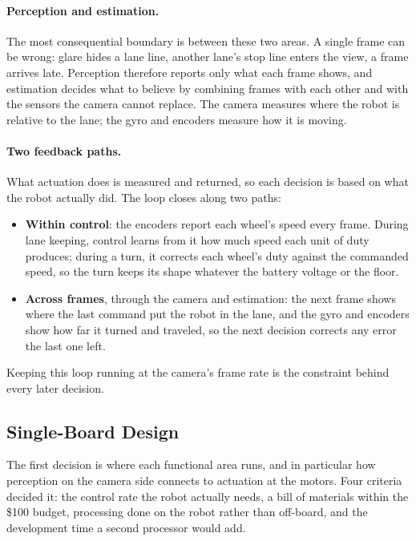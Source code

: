 \paragraph{Perception and estimation.}
The most consequential boundary is between these two areas. A single frame can
be wrong: glare hides a lane line, another lane's stop line enters the view, a
frame arrives late. Perception therefore reports only what each frame shows,
and estimation decides what to believe by combining frames with each other and
with the sensors the camera cannot replace. The camera measures where the robot
is relative to the lane; the gyro and encoders measure how it is moving.

\paragraph{Two feedback paths.}
What actuation does is measured and returned, so each decision is based on what
the robot actually did. The loop closes along two paths:

\begin{itemize}
      \item \textbf{Within control}: the encoders report each wheel's
            speed every frame. During lane keeping, control learns from it how
            much speed each unit of duty produces; during a turn, it corrects
            each wheel's duty against the commanded speed, so the turn keeps
            its shape whatever the battery voltage or the floor.
      \item \textbf{Across frames}, through the camera and estimation: the
            next frame shows where the last command put the robot in the lane,
            and the gyro and encoders show how far it turned and traveled, so
            the next decision corrects any error the last one left.
\end{itemize}

Keeping this loop running at the camera's frame rate is the constraint behind
every later decision.

\subsection{Single-Board Design}\label{sec:single_board}
The first decision is where each functional area runs, and in particular how
perception on the camera side connects to actuation at the motors. Four
criteria decided it: the control rate the robot actually needs, a bill of
materials within the \$100 budget, processing done on the robot rather than
off-board, and the development time a second processor would add.

